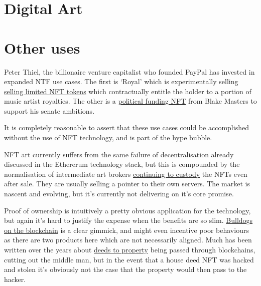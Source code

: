 
\section{Digital Art}


\section{Other uses}
Peter Thiel, the billionaire venture capitalist who founded PayPal has invested in expanded NTF use cases. The first is `Royal' which is experimentally  selling \href{https://royal.io/}{selling limited NFT tokens} which contractually entitle the holder to a portion of music artist royalties. The other is a \href{https://www.ztonft.com/}{political funding NFT} from Blake Masters to support his senate ambitions.

It is completely reasonable to assert that these use cases could be accomplished without the use of NFT technology, and is part of the hype bubble.\par
NFT art currently suffers from the same failure of decentralisation already discussed in the Ethererum technology stack, but this is compounded by the normalisation of intermediate art brokers \href{https://moxie.org/2022/01/07/web3-first-impressions.html}{continuing to custody} the NFTs even after sale. They are usually selling a pointer to their own servers. The market is nascent and evolving, but it's currently not delivering on it's core promise.\par
Proof of ownership is intuitively a pretty obvious application for the technology, but again it's hard to justify the expense when the benefits are so slim. \href{https://www.bullishlybred.com/}{Bulldogs on the blockchain} is a clear gimmick, and might even incentive poor behaviours as there are two products here which are not necessarily aligned. Much has been written over the years about \href{https://propy.com/browse/propy-nft/}{deeds to property} being passed through blockchains, cutting out the middle man, but in the event that a house deed NFT was hacked and stolen it's obviously not the case that the property would then pass to the hacker.

